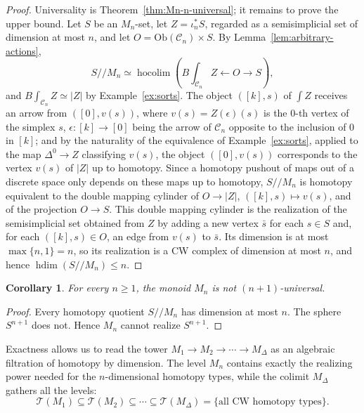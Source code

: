 \documentclass[11pt]{amsart}
\newtheorem{corollary}[teo]{Corollary}
\theoremstyle{definition}
\theoremstyle{remark}
\numberwithin{figure}{section}%
\newcommand{\CC}{\mathcal{C}}
\DeclareMathOperator{\hocolim}{hocolim}
\newcommand{\T}{\mathcal{T}}
\newcommand{\Ob}{\mathrm{Ob}}
\begin{document}
\begin{proof}
Universality is Theorem~\ref{thm:Mn-n-universal}; it remains to prove the upper bound. Let $S$ be an $M_n$-set, let $Z=\iota_n^*S$, regarded as a semisimplicial set of dimension at most $n$, and let $O=\Ob(\CC_n)\times S$. By Lemma~\ref{lem:arbitrary-actions},
\[
S/\!/M_n\simeq\hocolim\left(B\!\int_{\CC_n}Z\longleftarrow O\longrightarrow S\right),
\]
and $B\!\int_{\CC_n}Z\simeq|Z|$ by Example~\ref{ex:sorts}. The object $([k],s)$ of $\int Z$ receives an arrow from $([0],v(s))$, where $v(s)=Z(\epsilon)(s)$ is the $0$-th vertex of the simplex $s$, $\epsilon\colon[k]\to[0]$ being the arrow of $\CC_n$ opposite to the inclusion of $0$ in $[k]$; and by the naturality of the equivalence of Example~\ref{ex:sorts}, applied to the map $\Delta^0\to Z$ classifying $v(s)$, the object $([0],v(s))$ corresponds to the vertex $v(s)$ of $|Z|$ up to homotopy. Since a homotopy pushout of maps out of a discrete space only depends on these maps up to homotopy, $S/\!/M_n$ is homotopy equivalent to the double mapping cylinder of $O\to|Z|$, $([k],s)\mapsto v(s)$, and of the projection $O\to S$. This double mapping cylinder is the realization of the semisimplicial set obtained from $Z$ by adding a new vertex $\bar s$ for each $s\in S$ and, for each $([k],s)\in O$, an edge from $v(s)$ to $\bar s$. Its dimension is at most $\max\{n,1\}=n$, so its realization is a CW complex of dimension at most $n$, and hence $\operatorname{hdim}(S/\!/M_n)\leq n$.
\end{proof}

\begin{corollary}
\label{cor:Mn-not-higher-master}
For every $n\geq1$, the monoid $M_n$ is not $(n+1)$-universal.
\end{corollary}

\begin{proof}
Every homotopy quotient $S/\!/M_n$ has dimension at most $n$. The sphere $S^{n+1}$ does not. Hence $M_n$ cannot realize $S^{n+1}$.
\end{proof}

Exactness allows us to read the tower $M_1\to M_2\to\cdots\to M_\Delta$ as an algebraic filtration of homotopy by dimension. The level $M_n$ contains exactly the realizing power needed for the $n$-dimensional homotopy types, while the colimit $M_\Delta$ gathers all the levels:
\[
\T(M_1)\subseteq\T(M_2)\subseteq\cdots\subseteq\T(M_\Delta)=\{\text{all CW homotopy types}\}.
\]
\end{document}
